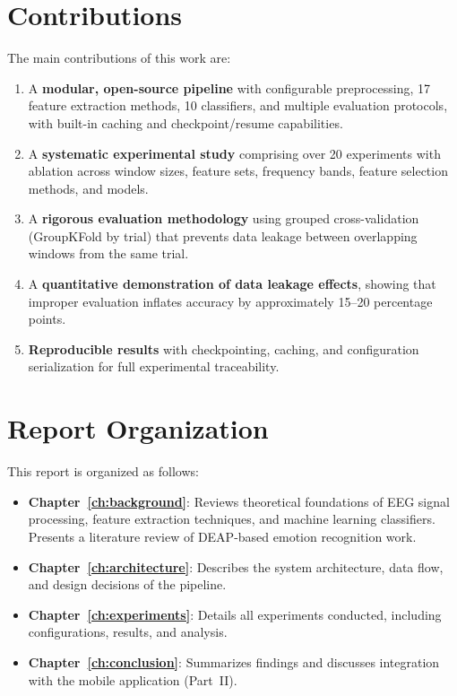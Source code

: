 \documentclass[12pt,a4paper]{report}
\begin{document}
\section{Contributions}
\label{sec:contributions}

The main contributions of this work are:

\begin{enumerate}[noitemsep]
    \item A \textbf{modular, open-source pipeline} with configurable preprocessing,
          17 feature extraction methods, 10 classifiers, and multiple evaluation
          protocols, with built-in caching and checkpoint/resume capabilities.
    \item A \textbf{systematic experimental study} comprising over 20 experiments
          with ablation across window sizes, feature sets, frequency bands,
          feature selection methods, and models.
    \item A \textbf{rigorous evaluation methodology} using grouped
          cross-validation (GroupKFold by trial) that prevents data leakage
          between overlapping windows from the same trial.
    \item A \textbf{quantitative demonstration of data leakage effects},
          showing that improper evaluation inflates accuracy by approximately
          15--20 percentage points.
    \item \textbf{Reproducible results} with checkpointing, caching, and
          configuration serialization for full experimental traceability.
\end{enumerate}

\section{Report Organization}
\label{sec:organization}

This report is organized as follows:

\begin{itemize}[noitemsep]
    \item \textbf{Chapter~\ref{ch:background}}: Reviews theoretical foundations
          of EEG signal processing, feature extraction techniques, and machine
          learning classifiers. Presents a literature review of DEAP-based
          emotion recognition work.
    \item \textbf{Chapter~\ref{ch:architecture}}: Describes the system
          architecture, data flow, and design decisions of the pipeline.
    \item \textbf{Chapter~\ref{ch:experiments}}: Details all experiments
          conducted, including configurations, results, and analysis.
    \item \textbf{Chapter~\ref{ch:conclusion}}: Summarizes findings and
          discusses integration with the mobile application (Part~II).
\end{itemize}
\end{document}
